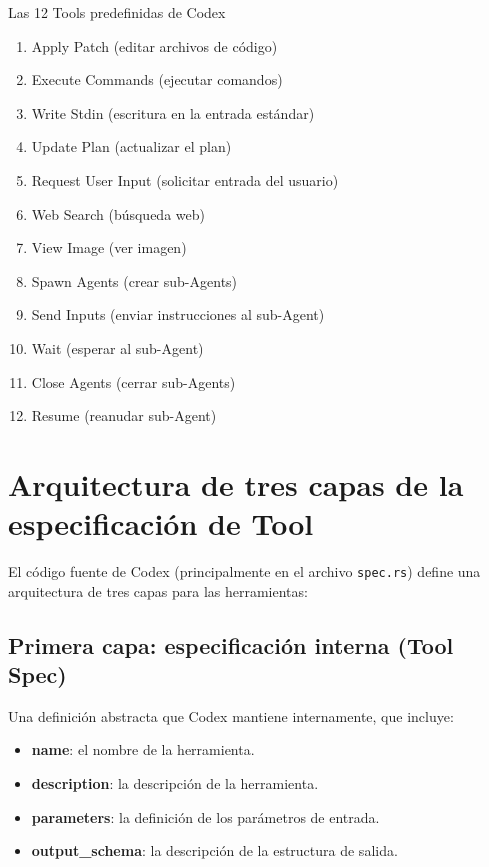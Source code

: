 \documentclass[a4paper]{article}
\begin{document}
\begin{knowledgebox}{Las 12 Tools predefinidas de Codex}
\begin{enumerate}
    \item Apply Patch (editar archivos de código)
    \item Execute Commands (ejecutar comandos)
    \item Write Stdin (escritura en la entrada estándar)
    \item Update Plan (actualizar el plan)
    \item Request User Input (solicitar entrada del usuario)
    \item Web Search (búsqueda web)
    \item View Image (ver imagen)
    \item Spawn Agents (crear sub-Agents)
    \item Send Inputs (enviar instrucciones al sub-Agent)
    \item Wait (esperar al sub-Agent)
    \item Close Agents (cerrar sub-Agents)
    \item Resume (reanudar sub-Agent)
\end{enumerate}
\end{knowledgebox}

\section{Arquitectura de tres capas de la especificación de Tool}

El código fuente de Codex (principalmente en el archivo \texttt{spec.rs}) define una arquitectura de tres capas para las herramientas:

\subsection{Primera capa: especificación interna (Tool Spec)}

Una definición abstracta que Codex mantiene internamente, que incluye:
\begin{itemize}
    \item \textbf{name}: el nombre de la herramienta.
    \item \textbf{description}: la descripción de la herramienta.
    \item \textbf{parameters}: la definición de los parámetros de entrada.
    \item \textbf{output\_schema}: la descripción de la estructura de salida.
\end{itemize}
\end{document}
